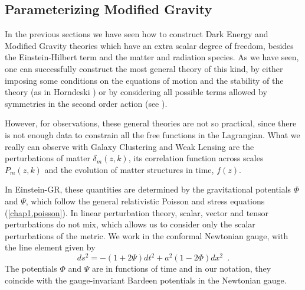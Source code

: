 \subsection{Parameterizing Modified Gravity}

In the previous sections we have seen how to construct Dark Energy and Modified Gravity theories 
which have an extra scalar degree of freedom, besides the Einstein-Hilbert term and the matter and radiation species.
As we have seen, one can successfully construct the most general theory of this kind, by either imposing
some conditions on the equations of motion and the stability of the theory (as in Horndeski \cite{horndeski}) or by considering all
possible terms allowed by symmetries in the second order action (see \cite{creminelli, gubitosi, gleyzes}).

However, for observations, these general theories are not so practical, since there is not enough data to constrain
all the free functions in the Lagrangian. What we really can observe with Galaxy Clustering and Weak Lensing 
are the perturbations of matter $\delta_m(z,k)$, its correlation function across scales $P_m(z,k)$ and the
evolution of matter structures in time, $f(z)$.

In Einstein-GR, these quantities are determined by the gravitational potentials $\Phi$ and $\Psi$, which follow 
the general relativistic Poisson and stress equations (\cref{chap1,poisson}). 
In linear perturbation theory, scalar, vector and tensor perturbations
do not mix, which allows us to consider only the scalar perturbations of the metric. 
We work in the conformal Newtonian gauge, with the
line element given by 
\begin{equation}
ds^{2}=-(1+2\Psi)dt^{2}+a^{2}(1-2\Phi)dx^{2}\,\,\,.
\end{equation}
The potentials $\Phi$ and $\Psi$ are in functions of time and in our notation, they coincide
with the gauge-invariant Bardeen potentials in the Newtonian gauge.


